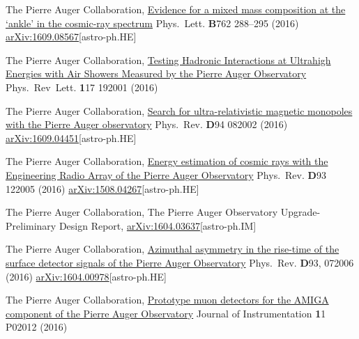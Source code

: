 \begin{etaremune}
\item {}The Pierre Auger Collaboration, \href{http://dx.doi.org/10.1016/j.physletb.2016.09.039}{{Evidence for a mixed mass composition at the ‘ankle’ in the cosmic-ray spectrum}} Phys.\ Lett. {\textbf B762} 288--295 (2016) \href{http://arxiv.org/abs/1609.08567}{arXiv:1609.08567}[astro-ph.HE]

\item {}The Pierre Auger Collaboration, \href{https://doi.org/10.1103/PhysRevLett.117.192001}{{Testing Hadronic Interactions at Ultrahigh Energies with Air Showers Measured by the Pierre Auger Observatory}} Phys.\ Rev\  Lett.  {\textbf 117} 192001 (2016) %

\item {}The Pierre Auger Collaboration, \href{https://doi.org/10.1103/PhysRevD.94.082002}{{Search for ultra-relativistic magnetic monopoles with the Pierre Auger observatory}} Phys.\ Rev. {\textbf D94} 082002 (2016) \href{http://arxiv.org/abs/1609.04451}{arXiv:1609.04451}[astro-ph.HE]

\item {}The Pierre Auger Collaboration, \href{https://doi.org/10.1103/PhysRevD.93.122005}{{Energy estimation of cosmic rays with the Engineering Radio Array of the Pierre Auger Observatory}} Phys.\ Rev. {\textbf D93} 122005 (2016) \href{http://arxiv.org/abs/1508.04267}{arXiv:1508.04267}[astro-ph.HE]

\item {} The Pierre Auger Collaboration, {{The Pierre Auger Observatory Upgrade-Preliminary Design Report}}, \href{http://arxiv.org/abs/1604.03637}{arXiv:1604.03637}[astro-ph.IM]

\item {}The Pierre Auger Collaboration, \href{http://journals.aps.org/prd/abstract/10.1103/PhysRevD.93.072006}{{Azimuthal asymmetry in the rise-time of the surface detector signals of the Pierre Auger Observatory}} Phys.\ Rev. {\textbf D93}, 072006 (2016) \href{http://arxiv.org/abs/1604.00978}{arXiv:1604.00978}[astro-ph.HE]

\item {}The Pierre Auger Collaboration, \href{http://iopscience.iop.org/article/10.1088/1748-0221/11/02/P02012}{{Prototype muon detectors for the AMIGA component of the Pierre Auger Observatory}} Journal of Instrumentation {\textbf 11} P02012 (2016) %


\end{etaremune}
